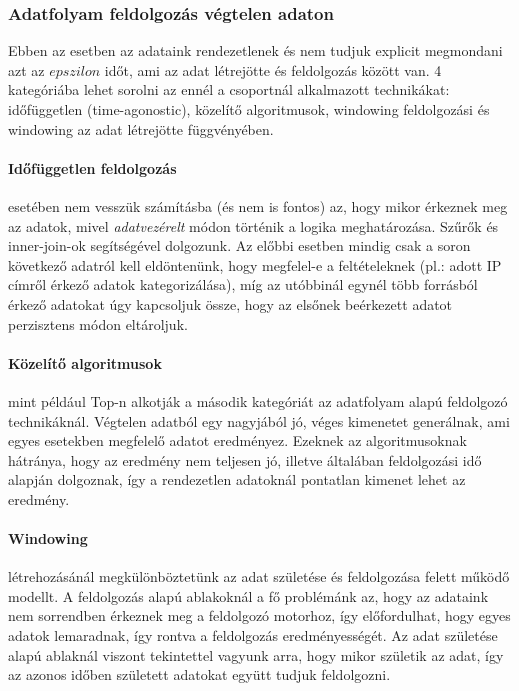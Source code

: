 \documentclass[a4paper,12pt]{article}
\begin{document}
\subsubsection{Adatfolyam feldolgozás végtelen adaton}
Ebben az esetben az adataink rendezetlenek és nem tudjuk explicit megmondani azt az $epszilon$ időt, ami az adat létrejötte és feldolgozás között van. 4 kategóriába lehet sorolni az ennél a csoportnál alkalmazott technikákat: időfüggetlen (time-agonostic), közelítő algoritmusok, windowing feldolgozási és windowing az adat létrejötte függvényében. 

\paragraph{Időfüggetlen feldolgozás}\hspace*{-0.4cm} esetében nem vesszük számításba (és nem is fontos) az, hogy mikor érkeznek meg az adatok, mivel \textsl{adatvezérelt} módon történik a logika meghatározása. Szűrők és inner-join-ok segítségével dolgozunk. Az előbbi esetben mindig csak a soron következő adatról kell eldöntenünk, hogy megfelel-e a feltételeknek (pl.: adott IP címről érkező adatok kategorizálása), míg az utóbbinál egynél több forrásból érkező adatokat úgy kapcsoljuk össze, hogy az elsőnek beérkezett adatot perzisztens módon eltároljuk. 

\paragraph{Közelítő algoritmusok}\hspace*{-0.4cm} mint például Top-n\cite{topn} alkotják a második kategóriát az adatfolyam alapú feldolgozó technikáknál. Végtelen adatból egy nagyjából jó, véges kimenetet generálnak, ami egyes esetekben megfelelő adatot eredményez. Ezeknek az algoritmusoknak hátránya, hogy az eredmény nem teljesen jó, illetve általában feldolgozási idő alapján dolgoznak, így a rendezetlen adatoknál pontatlan kimenet lehet az eredmény.

\paragraph{Windowing}\hspace*{-0.4cm} létrehozásánál megkülönböztetünk az adat születése és feldolgozása felett működő modellt. A feldolgozás alapú ablakoknál a fő problémánk az, hogy az adataink nem sorrendben érkeznek meg a feldolgozó motorhoz, így előfordulhat, hogy egyes adatok lemaradnak, így rontva a feldolgozás eredményességét. Az adat születése alapú ablaknál viszont tekintettel vagyunk arra, hogy mikor születik az adat, így az azonos időben született adatokat együtt tudjuk feldolgozni.
\end{document}

